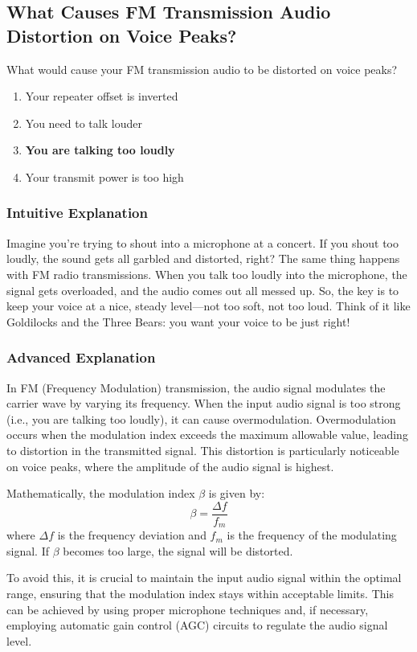 \subsection{What Causes FM Transmission Audio Distortion on Voice Peaks?}
\label{T2B05}

\begin{tcolorbox}[colback=gray!10!white,colframe=black!75!black,title=T2B05]
What would cause your FM transmission audio to be distorted on voice peaks?
\begin{enumerate}[label=\Alph*)]
    \item Your repeater offset is inverted
    \item You need to talk louder
    \item \textbf{You are talking too loudly}
    \item Your transmit power is too high
\end{enumerate}
\end{tcolorbox}

\subsubsection{Intuitive Explanation}
Imagine you're trying to shout into a microphone at a concert. If you shout too loudly, the sound gets all garbled and distorted, right? The same thing happens with FM radio transmissions. When you talk too loudly into the microphone, the signal gets overloaded, and the audio comes out all messed up. So, the key is to keep your voice at a nice, steady level—not too soft, not too loud. Think of it like Goldilocks and the Three Bears: you want your voice to be just right!

\subsubsection{Advanced Explanation}
In FM (Frequency Modulation) transmission, the audio signal modulates the carrier wave by varying its frequency. When the input audio signal is too strong (i.e., you are talking too loudly), it can cause overmodulation. Overmodulation occurs when the modulation index exceeds the maximum allowable value, leading to distortion in the transmitted signal. This distortion is particularly noticeable on voice peaks, where the amplitude of the audio signal is highest.

Mathematically, the modulation index \( \beta \) is given by:
\[
\beta = \frac{\Delta f}{f_m}
\]
where \( \Delta f \) is the frequency deviation and \( f_m \) is the frequency of the modulating signal. If \( \beta \) becomes too large, the signal will be distorted.

To avoid this, it is crucial to maintain the input audio signal within the optimal range, ensuring that the modulation index stays within acceptable limits. This can be achieved by using proper microphone techniques and, if necessary, employing automatic gain control (AGC) circuits to regulate the audio signal level.

